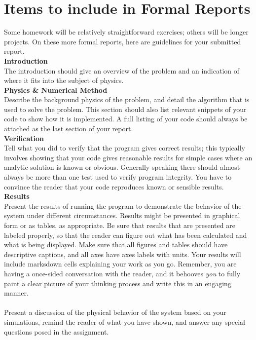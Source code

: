 \documentclass[justified]{tufte-handout}
\begin{document}
\section{Items to include in Formal Reports}
Some homework will be relatively straightforward exercises; others will be longer projects. On these more formal reports, here are guidelines for your submitted report. \\
{\bf Introduction} \\ 
The introduction should give an overview of the problem and an indication of where it fits into the subject of physics.\\
{\bf Physics \& Numerical Method} \\ 
Describe the background physics of the problem, and detail the algorithm that is used to solve the problem. This section should also list relevant snippets of your code to show how it is implemented.  A full listing of your code should always be attached as the last section of your report.\\
{\bf Verification} \\
Tell what you did to verify that the program gives correct results; this typically involves showing that your code gives reasonable results for simple cases where an analytic solution is known or obvious.  Generally speaking there should almost always be more than one test used to verify program integrity. You have to convince the reader that your code reproduces known or sensible results. \\
{\bf Results} \\
Present the results of running the program to demonstrate the behavior of the system under different circumstances. Results might be presented in graphical form or as tables, as appropriate. Be sure that results that are presented are labeled properly, so that the reader can figure out what has been calculated and what is being displayed. Make sure that all figures and tables should have descriptive captions, and all axes have axes labels with units. Your results will include marksdown cells explaining your work as you go. Remember, you are having a once-sided conversation with the reader, and it behooves \textit{you} to fully paint a clear picture of your thinking process and write this in an engaging manner.  \\
 \\
Present a discussion of the physical behavior of the system based on your simulations, remind the reader of what you have shown, and answer any special questions posed in the assignment.\\
\end{document}
